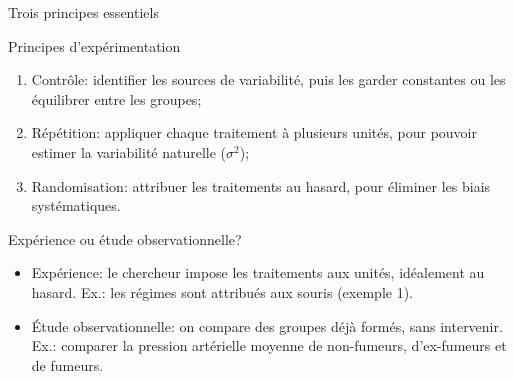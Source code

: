 \documentclass{BeamerTemplate}
\begin{document}
\begin{frame}[t]{Trois principes essentiels}

\begin{Boite}{Principes d'expérimentation}
\small
\begin{enumerate}
  \item \alert{Contrôle}: identifier les sources de variabilité, puis les garder
  constantes ou les équilibrer entre les groupes;
  \item \alert{Répétition}: appliquer chaque traitement à plusieurs unités, pour
  pouvoir estimer la variabilité naturelle ($\sigma^2$);
  \item \alert{Randomisation}: attribuer les traitements au hasard, pour éliminer
  les biais systématiques.
\end{enumerate}
\end{Boite}


\end{frame}

\begin{frame}[t]{Expérience ou étude observationnelle?}

\small
\begin{itemize}\itemsep2mm
  \item \alert{Expérience}: le chercheur \alert{impose} les traitements aux unités,
  idéalement au hasard. Ex.: les régimes sont attribués aux souris (exemple 1).
  \item \alert{Étude observationnelle}: on compare des groupes \alert{déjà formés},
  sans intervenir. Ex.: comparer la pression artérielle moyenne de non-fumeurs,
  d'ex-fumeurs et de fumeurs.
\end{itemize}

\medskip
{}

\end{frame}
\end{document}
